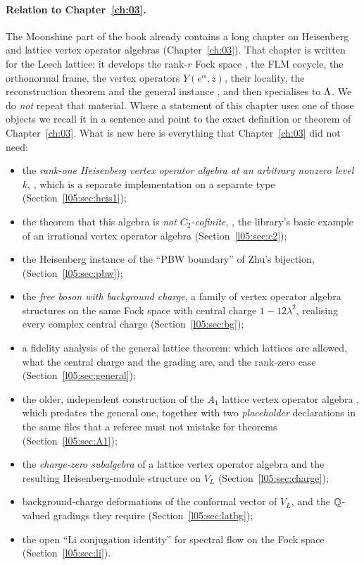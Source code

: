 \paragraph{Relation to Chapter~\ref{ch:03}.} The Moonshine part of the book already contains a long
chapter on Heisenberg and lattice vertex operator algebras (Chapter~\ref{ch:03}). That chapter is
written for the Leech lattice: it develops the rank-$r$ Fock space , the FLM
cocycle, the orthonormal frame, the vertex operators $Y(e^\alpha,z)$, their locality, the
reconstruction theorem and the general instance , and then specialises to
${\Lambda}$. We do \emph{not} repeat that material. Where a statement of this chapter uses one of those
objects we recall it in a sentence and point to the exact definition or theorem of
Chapter~\ref{ch:03}. What is new here is everything that Chapter~\ref{ch:03} did not need:
\begin{itemize}
\item the \emph{rank-one Heisenberg vertex operator algebra at an arbitrary nonzero level $k$},
  , which is a separate implementation on a separate type
  (Section~\ref{l05:sec:heis1});
\item the theorem that this algebra is \emph{not $C_2$-cofinite}, ,
  the library's basic example of an irrational vertex operator algebra
  (Section~\ref{l05:sec:c2});
\item the Heisenberg instance of the ``PBW boundary'' of Zhu's bijection,
   (Section~\ref{l05:sec:pbw});
\item the \emph{free boson with background charge}, a family of vertex operator algebra structures on
  the same Fock space with central charge $1-12\lambda^2$, realising every complex central charge
  (Section~\ref{l05:sec:bg});
\item a fidelity analysis of the general lattice theorem: which lattices are allowed, what the
  central charge and the grading are, and the rank-zero case (Section~\ref{l05:sec:general});
\item the older, independent construction of the $A_1$ lattice vertex operator algebra
  , which predates the general one, together with two \emph{placeholder}
  declarations in the same files that a referee must not mistake for theorems
  (Section~\ref{l05:sec:A1});
\item the \emph{charge-zero subalgebra}  of a lattice vertex operator algebra and
  the resulting Heisenberg-module structure on $V_L$ (Section~\ref{l05:sec:charge});
\item background-charge deformations of the conformal vector of $V_L$, and the ${\mathbb{Q}}$-valued gradings
  they require (Section~\ref{l05:sec:latbg});
\item the open ``Li conjugation identity'' for spectral flow on the Fock space
  (Section~\ref{l05:sec:li}).
\end{itemize}

